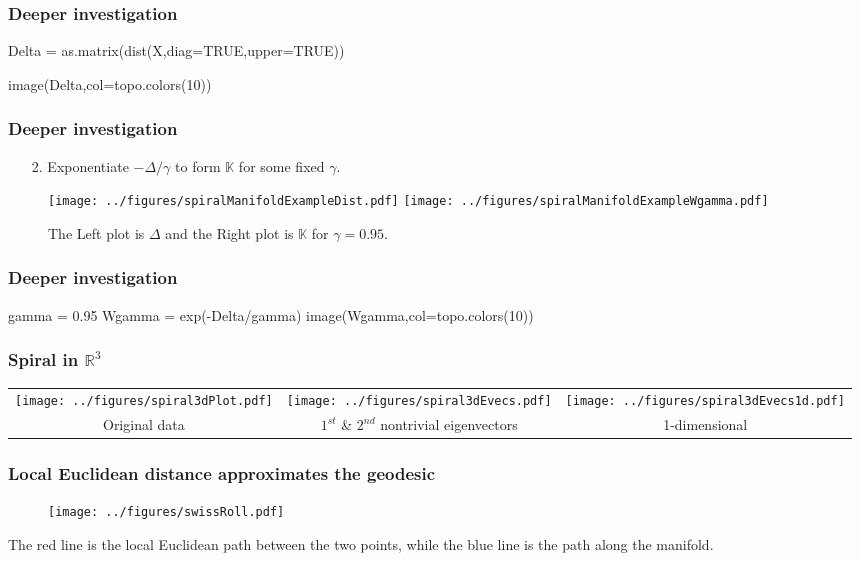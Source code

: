 \documentclass{beamer}
\begin{document}
\begin{frame}[fragile]
\frametitle{Deeper investigation}

\begin{blockcode}
Delta = as.matrix(dist(X,diag=TRUE,upper=TRUE))

image(Delta,col=topo.colors(10))
\end{blockcode}
\end{frame}
\begin{frame}
  \frametitle{Deeper investigation}
  \begin{itemize}
  \item[2.] Exponentiate $-\Delta/\gamma$ to form  $\mathbb{K}$ for some fixed $\gamma$.
  \end{itemize}
  \begin{figure}
    \centering
    \texttt{[image: ../figures/spiralManifoldExampleDist.pdf]}
    \texttt{[image: ../figures/spiralManifoldExampleWgamma.pdf]}
    \caption{The Left plot is $\Delta$ and the Right plot is $ \mathbb{K}$ for $\gamma = 0.95$. }  
  \end{figure}
\end{frame}

\begin{frame}[fragile]
\frametitle{Deeper investigation}

\begin{blockcode}
gamma = 0.95
Wgamma = exp(-Delta/gamma)
image(Wgamma,col=topo.colors(10))
\end{blockcode}
\end{frame}

%

\begin{frame}[fragile]
\frametitle{Spiral in $\mathbb{R}^3$}
  \begin{tabular}{ccc}
    \texttt{[image: ../figures/spiral3dPlot.pdf]} &
    \texttt{[image: ../figures/spiral3dEvecs.pdf]} & 
        \texttt{[image: ../figures/spiral3dEvecs1d.pdf]} \\
        Original data & $1^{st}$ \& $2^{nd}$ nontrivial eigenvectors & 1-dimensional
 \end{tabular}

\end{frame}

\begin{frame}[fragile]
  \frametitle{Local Euclidean distance approximates the geodesic}
  \begin{figure}
    \centering
    \texttt{[image: ../figures/swissRoll.pdf]}
  \end{figure}
The red line is the local Euclidean path between the two points, while the blue line is the path along 
the manifold.

\end{frame}
\end{document}
